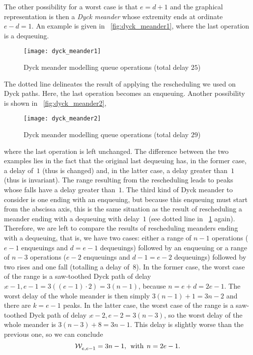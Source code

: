 The other possibility for a worst case is that \(e=d+1\) and the
graphical representation is then a \emph{Dyck meander} whose extremity
ends at ordinate \(e-d=1\). An example is given in
\fig~\vref{fig:dyck_meander1}, where the last operation is a
dequeuing.
\begin{figure}[t]
\centering
\texttt{[image: dyck\_meander1]}
\caption{Dyck meander modelling queue operations (total delay
  \(25\))\label{fig:dyck_meander1}}
\end{figure}
The dotted line delineates the result of applying the rescheduling we
used on Dyck paths. Here, the last operation becomes an
enqueuing. Another possibility is shown in
\fig~\vref{fig:dyck_meander2},
\begin{figure}[b]
\centering
\texttt{[image: dyck\_meander2]}
\caption{Dyck meander modelling queue operations (total delay
  \(29\))\label{fig:dyck_meander2}}
\end{figure}
where the last operation is left unchanged. The difference between the
two examples lies in the fact that the original last dequeuing has, in
the former case, a delay of~\(1\) (thus is changed) and, in the latter
case, a delay greater than~\(1\) (thus is invariant). The range
resulting from the rescheduling leads to peaks whose falls have a
delay greater than~\(1\). The third kind of Dyck meander to consider
is one ending with an enqueuing, but because this enqueuing must start
from the abscissa axis, this is the same situation as the result of
rescheduling a meander ending with a dequeuing with delay~\(1\) (see
dotted line in \fig~\ref{fig:dyck_meander1} again). Therefore, we are
left to compare the results of rescheduling meanders ending with a
dequeuing, that is, we have two cases: either a range of \({n-1}\)
operations (\({e-1}\) enqueuings and \(d=e-1\) dequeuings) followed by
an enqueuing or a range of \({n-3}\) operations (\({e-2}\) enqueuings
and \(d-1=e-2\) dequeuings) followed by two rises and one fall
(totalling a delay of~\(8\)). In the former case, the worst case of
the range is a saw\hyp{}toothed Dyck path of delay
\(\comp{}{e-1,e-1}=3((e-1)\cdot 2)=3(n-1)\), because
\(n=e+d=2e-1\). The worst delay of the whole meander is then simply
\(3(n-1)+1 = 3n-2\) and there are \(k=e-1\) peaks. In the latter case,
the worst case of the range is a saw\hyp{}toothed Dyck path of delay
\(\comp{}{e-2,e-2}=3(n-3)\), so the worst delay of the whole meander
is \(3(n-3)+8=3n-1\). This delay is slightly worse than the previous
one, so we can conclude
\[
\mathcal{W}_{e,e-1}^{\texttt{}} = 3n-1,\,\; \text{with} \,\; n = 2e-1.
\]

